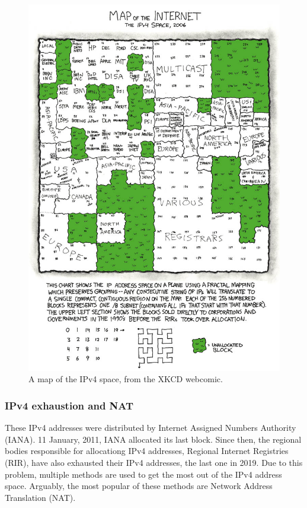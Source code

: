 \begin{figure}
    \centering
    \includegraphics[scale=4]{Figurer/map_of_the_internet.jpg}
    \caption{A map of the IPv4 space, from the XKCD webcomic. \cite{xkcd} }
    \label{fig:ipv4_map}
\end{figure}

\subsubsection{IPv4 exhaustion and NAT}
 These IPv4 addresses were distributed by Internet Assigned Numbers Authority (IANA). 11 January, 2011, IANA allocated its last block.\cite{exhasuted_IPV4} Since then, the regional bodies responsible for allocationg IPv4 addresses, Regional Internet Registries (RIR), have also exhausted their IPv4 addresses, the last one in 2019.\cite{exhausted_RIPENNC} Due to this problem, multiple methods are used to get the most out of the IPv4 address space. Arguably, the most popular of these methods are Network Address Translation (NAT).

